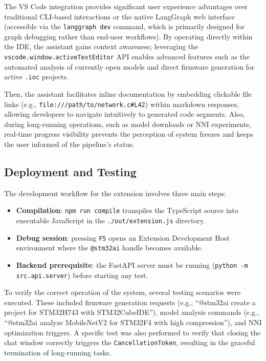 The VS Code integration provides significant user experience advantages over traditional CLI-based interactions or the native LangGraph web interface (accessible via the \texttt{langgraph dev} command, which is primarily designed for graph debugging rather than end-user workflows). By operating directly within the IDE, the assistant gains context awareness; leveraging the \texttt{vscode.window.activeTextEditor} API enables advanced features such as the automated analysis of currently open models and direct firmware generation for active \texttt{.ioc} projects.

Then, the assistant facilitates inline documentation by embedding clickable file links (e.g., \texttt{file:///path/to/network.c\#L42}) within markdown responses, allowing developers to navigate intuitively to generated code segments. Also, during long-running operations, such as model downloads or NNI experiments, real-time progress visibility prevents the perception of system freezes and keeps the user informed of the pipeline's status.


\subsection{Deployment and Testing}

The development workflow for the extension involves three main steps:

\begin{itemize}
    \item \textbf{Compilation}: \texttt{npm run compile} transpiles the TypeScript source into executable JavaScript in the \texttt{./out/extension.js} directory.
    \item \textbf{Debug session}: pressing \texttt{F5} opens an Extension Development Host environment where the \texttt{@stm32ai} handle becomes available.
    \item \textbf{Backend prerequisite}: the FastAPI server must be running (\texttt{python -m src.api.server}) before starting any test.
\end{itemize}

To verify the correct operation of the system, several testing scenarios were executed. These included firmware generation requests (e.g., ``@stm32ai create a project for STM32H743 with STM32CubeIDE''), model analysis commands (e.g., ``@stm32ai analyze MobileNetV2 for STM32F4 with high compression''), and NNI optimization triggers. A specific test was also performed to verify that closing the chat window correctly triggers the \texttt{CancellationToken}, resulting in the graceful termination of long-running tasks.
